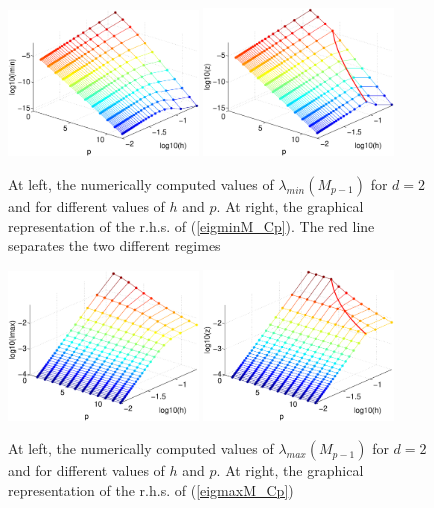 \documentclass[11pt]{article}
\begin{document}
\begin{figure}
\begin{center}
\includegraphics[width=0.45\textwidth]{Images/igap_eigM2min.eps}\quad
\includegraphics[width=0.45\textwidth]{Images/igap_eigM2smin.eps}\\
\end{center}
\caption{At left, the numerically computed values of
$\lambda_{min}(M_{p-1})$ for $d=2$ and
for different values of $h$ and $p$. At right,
the graphical representation of the r.h.s. of (\ref{eigminM_Cp}). The red line
separates the two different regimes}
\label{fig:massmin-igapd2}
\end{figure}

\begin{figure}
\begin{center}
\includegraphics[width=0.45\textwidth]{Images/igap_eigM2max.eps}\quad
\includegraphics[width=0.45\textwidth]{Images/igap_eigM2smax.eps}\\
\end{center}
\caption{At left, the numerically computed values of
$\lambda_{max}(M_{p-1})$ for $d=2$ and
for different values of $h$ and $p$. At right,
the graphical representation of the r.h.s. of (\ref{eigmaxM_Cp})}
\label{fig:massmax-igapd2}
\end{figure}
\end{document}
